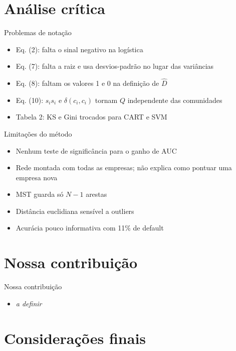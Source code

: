
\section{Análise crítica}

\begin{frame}{Problemas de notação}
  \begin{itemize}
    \item Eq. (2): falta o sinal negativo na logística
    \item Eq. (7): falta a raiz e usa desvios-padrão no lugar das variâncias
    \item Eq. (8): faltam os valores 1 e 0 na definição de $\hat{D}$
    \item Eq. (10): $s_i s_i$ e $\delta(c_i, c_i)$ tornam $Q$ independente das comunidades
    \item Tabela 2: KS e Gini trocados para CART e SVM
  \end{itemize}
\end{frame}

\begin{frame}{Limitações do método}
  \begin{itemize}
    \item Nenhum teste de significância para o ganho de AUC
    \item Rede montada com todas as empresas; não explica como pontuar uma empresa nova
    \item MST guarda só $N-1$ arestas
    \item Distância euclidiana sensível a outliers
    \item Acurácia pouco informativa com 11\% de default
  \end{itemize}
\end{frame}

\section{Nossa contribuição}

\begin{frame}{Nossa contribuição}
  \begin{itemize}
    \item \textit{a definir}
  \end{itemize}
\end{frame}

\section{Considerações finais}

